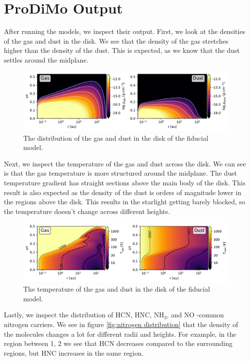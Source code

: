 \documentclass[twoside, single, authoryear, semicolon]{lion-msc}
\newcommand{\3}{$_3$}
\newcommand{\2}{$_2$}
\begin{document}
\section{ProDiMo Output}
After running the models, we inspect their output. First, we look at the densities of the gas and dust in the disk. We see that the density of the gas stretches higher than the density of the dust. This is expected, as we know that the dust settles around the midplane. 

\begin{figure}[!ht]
    \centering
    \includegraphics[width=\linewidth]{Figures/Density.pdf}
    \caption{The distribution of the gas and dust in the disk of the fiducial model.}
    \label{fig:density}
\end{figure}

Next, we inspect the temperature of the gas and dust across the disk. We can see is that the gas temperature is more structured around the midplane. The dust temperature gradient has straight sections above the main body of the disk. This result is also expected as the density of the dust is orders of magnitude lower in the regions above the disk. This results in the starlight getting barely blocked, so the temperature doesn't change across different heights.

\begin{figure}[!ht]
    \centering
    \includegraphics[width=\linewidth]{Figures/Temperature.pdf}
    \caption{The temperature of the gas and dust in the disk of the fiducial model.}
    \label{fig:temperature}
\end{figure}

Lastly, we inspect the distribution of HCN, HNC, NH\3, and NO -common nitrogen carriers. We see in figure \ref{fig:nitrogen distribution} that the density of the molecules changes a lot for different radii and heights. For example, in the region between 1, 2 we see that HCN decreases compared to the surrounding regions, but HNC increases in the same region. 
\end{document}
